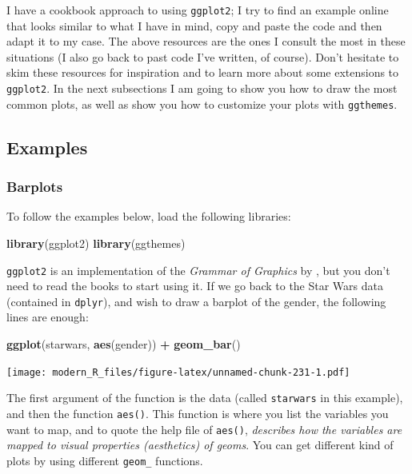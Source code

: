 \documentclass[]{gitbook}
\newenvironment{Shaded}{\begin{snugshade}}{\end{snugshade}}
\newcommand{\KeywordTok}[1]{\textcolor[rgb]{0.13,0.29,0.53}{\textbf{#1}}}
\newcommand{\NormalTok}[1]{#1}
\newcommand{\OperatorTok}[1]{\textcolor[rgb]{0.81,0.36,0.00}{\textbf{#1}}}
\newcommand{\StringTok}[1]{\textcolor[rgb]{0.31,0.60,0.02}{#1}}
\theoremstyle{definition}
\theoremstyle{definition}
\theoremstyle{definition}
\theoremstyle{remark}
\begin{document}
I have a cookbook approach to using \texttt{ggplot2}; I try to find an
example online that looks similar to what I have in mind, copy and paste
the code and then adapt it to my case. The above resources are the ones
I consult the most in these situations (I also go back to past code I've
written, of course). Don't hesitate to skim these resources for
inspiration and to learn more about some extensions to \texttt{ggplot2}.
In the next subsections I am going to show you how to draw the most
common plots, as well as show you how to customize your plots with
\texttt{ggthemes}.

\hypertarget{examples}{%
\subsection{Examples}\label{examples}}

\hypertarget{barplots}{%
\subsubsection{Barplots}\label{barplots}}

To follow the examples below, load the following libraries:

\begin{Shaded}
\begin{Highlighting}[]
\KeywordTok{library}\NormalTok{(ggplot2)}
\KeywordTok{library}\NormalTok{(ggthemes)}
\end{Highlighting}
\end{Shaded}

\texttt{ggplot2} is an implementation of the \emph{Grammar of Graphics}
by \citet{wilkinson2006}, but you don't need to read the books to start
using it. If we go back to the Star Wars data (contained in
\texttt{dplyr}), and wish to draw a barplot of the gender, the following
lines are enough:

\begin{Shaded}
\begin{Highlighting}[]
\KeywordTok{ggplot}\NormalTok{(starwars, }\KeywordTok{aes}\NormalTok{(gender)) }\OperatorTok{+}
\StringTok{  }\KeywordTok{geom_bar}\NormalTok{()}
\end{Highlighting}
\end{Shaded}

\texttt{[image: modern\_R\_files/figure-latex/unnamed-chunk-231-1.pdf]}

The first argument of the function is the data (called \texttt{starwars}
in this example), and then the function \texttt{aes()}. This function is
where you list the variables you want to map, and to quote the help file
of \texttt{aes()}, \emph{describes how the variables are mapped to
visual properties (aesthetics) of geoms}. You can get different kind of
plots by using different \texttt{geom\_} functions.
\end{document}
